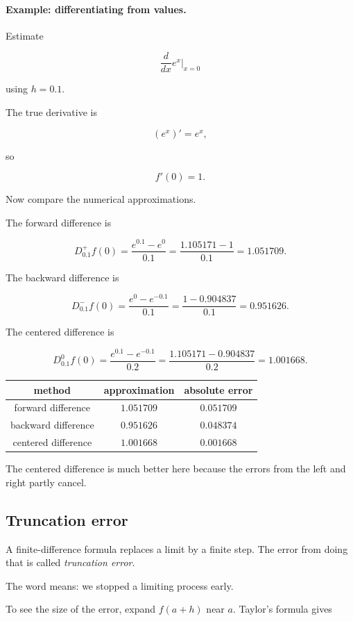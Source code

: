 \paragraph{Example: differentiating from values.}
Estimate

\[
\frac{d}{dx}e^x\Big|_{x=0}
\]

using \(h=0.1\).

The true derivative is

\[
\left(e^x\right)'=e^x,
\]

so

\[
f'(0)=1.
\]

Now compare the numerical approximations.

The forward difference is

\[
D_{0.1}^+f(0)
=
\frac{e^{0.1}-e^0}{0.1}
=
\frac{1.105171-1}{0.1}
=
1.051709.
\]

The backward difference is

\[
D_{0.1}^-f(0)
=
\frac{e^0-e^{-0.1}}{0.1}
=
\frac{1-0.904837}{0.1}
=
0.951626.
\]

The centered difference is

\[
D_{0.1}^0f(0)
=
\frac{e^{0.1}-e^{-0.1}}{0.2}
=
\frac{1.105171-0.904837}{0.2}
=
1.001668.
\]

\begin{center}
\begin{tabular}{c|c|c}
\textbf{method} & \textbf{approximation} & \textbf{absolute error} \\ \hline
forward difference & \(1.051709\) & \(0.051709\) \\
backward difference & \(0.951626\) & \(0.048374\) \\
centered difference & \(1.001668\) & \(0.001668\)
\end{tabular}
\end{center}

The centered difference is much better here because the errors from the left and right
partly cancel.

\subsection{Truncation error}
\label{subsec:truncation-error}

A finite-difference formula replaces a limit by a finite step.  The error from doing that
is called \emph{truncation error}.

The word means: we stopped a limiting process early.

To see the size of the error, expand \(f(a+h)\) near \(a\).  Taylor's formula gives

